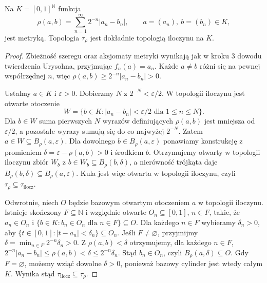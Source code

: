 \begin{twierdzenie}
\label{thm:topog-metryka-kostka-przeliczalna}
Na $K=[0,1]^{\mathbb N}$ funkcja
\[
\rho(a,b)=\sum_{n=1}^{\infty}2^{-n}|a_n-b_n|,
\qquad a=(a_n),\ b=(b_n)\in K,
\]
jest metryką. Topologia $\tau_\rho$ jest dokładnie
topologią iloczynu na $K$.
\end{twierdzenie}
\begin{proof}
Zbieżność szeregu oraz aksjomaty metryki wynikają jak
w kroku 3 dowodu twierdzenia Urysohna, przyjmując
$f_n(a)=a_n$. Każde $a\ne b$ różni się na pewnej
współrzędnej $n$, więc $\rho(a,b)\ge2^{-n}|a_n-b_n|>0$.

Ustalmy $a\in K$ i $\varepsilon>0$.
Dobierzmy $N$ z $2^{-N}<\varepsilon/2$.
W topologii iloczynu jest otwarte otoczenie
\[
W=\{b\in K:|a_n-b_n|<\varepsilon/2
\text{ dla }1\le n\le N\}.
\]
Dla $b\in W$ suma pierwszych $N$ wyrazów definiujących
$\rho(a,b)$ jest mniejsza od $\varepsilon/2$,
a pozostałe wyrazy sumują się do co najwyżej $2^{-N}$.
Zatem $a\in W\subseteq B_\rho(a,\varepsilon)$.
Dla dowolnego $b\in B_\rho(a,\varepsilon)$
ponawiamy konstrukcję z promieniem
$\delta=\varepsilon-\rho(a,b)>0$ i środkiem $b$.
Otrzymujemy otwarty w topologii iloczynu zbiór
$W_b$ z $b\in W_b\subseteq B_\rho(b,\delta)$,
a nierówność trójkąta daje
$B_\rho(b,\delta)\subseteq B_\rho(a,\varepsilon)$.
Kula jest więc otwarta w topologii iloczynu,
czyli $\tau_\rho\subseteq\tau_{\mathrm{ilocz}}$.

Odwrotnie, niech $O$ będzie bazowym otwartym
otoczeniem $a$ w topologii iloczynu. Istnieje skończony
$F\subseteq\mathbb N$ i względnie otwarte
$O_n\subseteq[0,1]$, $n\in F$, takie, że
$a_n\in O_n$ i
$\{b\in K:b_n\in O_n\text{ dla }n\in F\}\subseteq O$.
Dla każdego $n\in F$ wybieramy $\delta_n>0$,
aby $\{t\in[0,1]:|t-a_n|<\delta_n\}\subseteq O_n$.
Jeśli $F\ne\varnothing$, przyjmijmy
$\delta=\min_{n\in F}2^{-n}\delta_n>0$.
Z $\rho(a,b)<\delta$ otrzymujemy, dla każdego $n\in F$,
$2^{-n}|a_n-b_n|\le\rho(a,b)<\delta\le2^{-n}\delta_n$.
Stąd $b_n\in O_n$, czyli $B_\rho(a,\delta)\subseteq O$.
Gdy $F=\varnothing$, możemy wziąć dowolne $\delta>0$,
ponieważ bazowy cylinder jest wtedy całym $K$.
Wynika stąd $\tau_{\mathrm{ilocz}}\subseteq\tau_\rho$.
\end{proof}

